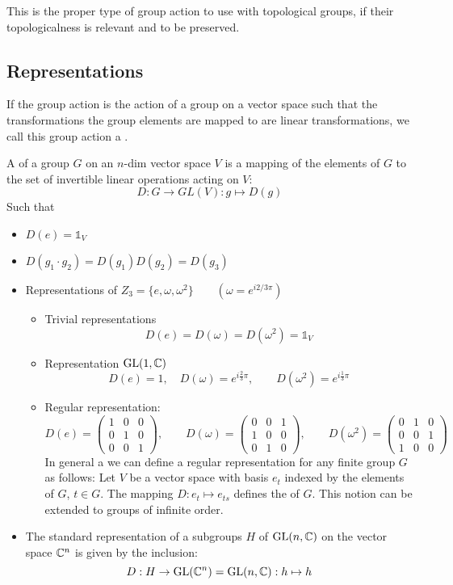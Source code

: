 This is the proper type of group action to use with topological groups, if their topologicalness is relevant and to be preserved.

\subsection{Representations}
If the group action is the action of a group on a vector space such that the transformations the group elements are mapped to are linear transformations, we call this group action a .

\begin{definition}
A  of a group $G$ on an $n$-dim vector space $V$ is a mapping of the elements of $G$ to the set of invertible linear operations acting on $V$:
\[D: G \rightarrow GL(V): g \mapsto D(g)\]
Such that
\begin{itemize}
\item $D(e) = \mathbb{1}_V$
\item $D(g_1\cdot g_2) = D(g_1)D(g_2) = D(g_3)$
\end{itemize}
\end{definition}

\begin{example}
\begin{itemize}
\item Representations of $Z_3 = \{e,\omega, \omega^2\} \qquad (\omega = e^{i2/3\pi})$
\begin{itemize}
\item Trivial representations
\[D(e) = D(\omega) = D(\omega^2) = \mathbb{1}_V\]
\item Representation $\operatorname{GL}(1, \mathbb{C})$
\[ D(e) = 1, \quad D(\omega) = e^{i\frac{2}{3}\pi} , \qquad D(\omega^2) = e^{i\frac{1}{3}\pi} \]
\item Regular representation:
\[D(e) = 
\begin{pmatrix}
1&0&0\\0&1&0\\0&0&1
\end{pmatrix}, \qquad D(\omega) = \begin{pmatrix}
0&0&1\\1&0&0\\0&1&0
\end{pmatrix}, \qquad D(\omega^2) = \begin{pmatrix}
0&1&0\\0&0&1\\1&0&0
\end{pmatrix}
\]
In general a we can define a regular representation for any finite group $G$ as follows: Let $V$ be a vector space with basis $e_t$ indexed by the elements of $G$, $t \in G$. The mapping $D: e_t \mapsto e_{ts}$ defines the  of $G$. This notion can be extended to groups of infinite order.
\end{itemize}
\item The standard representation of a subgroups $H$ of $\operatorname{GL}(n,\mathbb{C})$ on the vector space $\mathbb{C}^n$ is given by the inclusion:
\[ D: H \to \operatorname{GL}(\mathbb{C}^n) = \operatorname{GL}(n,\mathbb{C}): h \mapsto h \]
\end{itemize}
\end{example}


